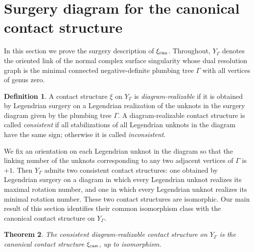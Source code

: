 \documentclass[11pt]{amsart}
\theoremstyle{plain}
\newtheorem{theorem}{Theorem}[section]
\theoremstyle{definition}
\newtheorem{definition}[theorem]{Definition}
\theoremstyle{remark}
\begin{document}
\section{Surgery diagram for the canonical contact structure}\label{sec:mainsurgery}

In this section we prove the surgery description of $\xi_{\rm can}$.
Throughout, $Y_\Gamma$ denotes the oriented link of the normal complex
surface singularity whose dual resolution graph is the minimal
connected negative-definite plumbing tree $\Gamma$ with all vertices
of genus zero.

\begin{definition}
A contact structure $\xi$ on $Y_\Gamma$ is \emph{diagram-realizable}
if it is obtained by Legendrian surgery on a Legendrian realization of
the unknots in the surgery diagram given by the plumbing tree
$\Gamma$. A diagram-realizable contact structure is called
\emph{consistent} if all stabilizations of all Legendrian unknots in
the diagram have the same sign; otherwise it is called
\emph{inconsistent}.
\end{definition}

We fix an orientation on each Legendrian unknot in the diagram so that
the linking number of the unknots corresponding to any two adjacent
vertices of $\Gamma$ is $+1$. Then $Y_\Gamma$ admits two consistent
contact structures: one obtained by Legendrian surgery on a diagram in
which every Legendrian unknot realizes its maximal rotation number,
and one in which every Legendrian unknot realizes its minimal rotation
number. These two contact structures are isomorphic. Our main result
of this section identifies their common isomorphism class with the
canonical contact structure on $Y_\Gamma$.

\begin{theorem}\label{thm:consistent}
The consistent diagram-realizable contact structure on $Y_\Gamma$ is
the canonical contact structure $\xi_{\rm can}$, up to
isomorphism.
\end{theorem}
\end{document}
